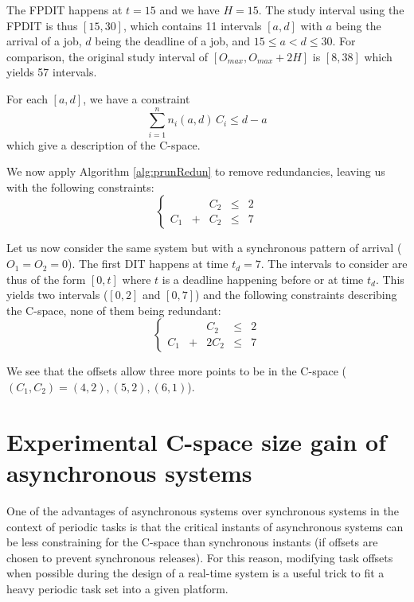 \documentclass[conference]{IEEEtran}
\begin{document}
The FPDIT happens at $t=15$ and we have $H = 15$. The study interval using the FPDIT is thus $[15, 30]$, which contains 11 intervals $[a,d]$ with $a$ being the arrival of a job, $d$ being the deadline of a job, and $15 \leqslant a < d \leqslant 30$. For comparison, the original study interval of $[O_{max}, O_{max} + 2H]$ is $[8, 38]$ which yields 57 intervals.

For each $[a, d]$, we have a constraint $$\sum_{i=1}^{n} n_i(a, d) \, C_i \leqslant d - a$$ which give a description of the C-space.

We now apply Algorithm \ref{alg:prunRedun} to remove redundancies, leaving us with the following constraints:
	\begin{equation}
		\left\{
			\begin{array}{ccccc}
				& & C_2 & \leqslant & 2 \\
				C_1 & + & C_2 & \leqslant & 7
			\end{array}
		\right.
	\end{equation}

Let us now consider the same system but with a synchronous pattern of arrival ($O_1 = O_2 = 0$). The first DIT happens at time $t_d = 7$. The intervals to consider are thus of the form $[0, t]$ where $t$ is a deadline happening before or at time $t_d$. This yields two intervals ($[0, 2]$ and $[0, 7]$) and the following constraints describing the C-space, none of them being redundant:
$$
\left\{
  \begin{array}{ccccc}
    & & C_2 & \leqslant & 2 \\
    C_1 & + & 2 C_2 & \leqslant & 7
  \end{array}
\right.
$$

We see that the offsets allow three more points to be in the C-space ($(C_1, C_2) = (4, 2), (5, 2), (6, 1)$).



\section{Experimental C-space size gain of asynchronous systems}
\label{sct:expCspaceGain}
	One of the advantages of asynchronous systems over synchronous systems in the
	context of periodic tasks is that the critical instants of asynchronous systems
	can be less constraining for the C-space than synchronous instants (if offsets are chosen to prevent synchronous releases). For this reason, modifying task offsets when possible during
	the design of a real-time system is a useful trick to fit a heavy periodic task set
	into a given platform.
\end{document}
